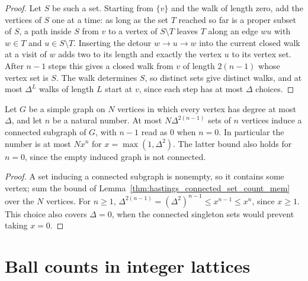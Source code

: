 \begin{proof}
    \leanok
    Let $S$ be such a set. Starting from $\{v\}$ and the walk of length zero,
    add the vertices of $S$ one at a time: as long as the set $T$ reached so
    far is a proper subset of $S$, a path inside $S$ from $v$ to a vertex of
    $S\setminus T$ leaves $T$ along an edge $wu$ with $w\in T$ and
    $u\in S\setminus T$. Inserting the detour $w\to u\to w$ into the current
    closed walk at a visit of $w$ adds two to its length and exactly the vertex
    $u$ to its vertex set. After $n-1$ steps this gives a closed walk from $v$
    of length $2(n-1)$ whose vertex set is $S$. The walk determines $S$, so
    distinct sets give distinct walks, and at most $\Delta^{L}$ walks of length
    $L$ start at $v$, since each step has at most $\Delta$ choices.
\end{proof}

\begin{lemma}
    \label{thm:hastings_connected_set_count}
    \leanok
    Let $G$ be a simple graph on $N$ vertices in which every vertex has degree
    at most $\Delta$, and let $n$ be a natural number. At most
    $N\Delta^{2(n-1)}$ sets of $n$ vertices induce a connected subgraph of $G$,
    with $n-1$ read as $0$ when $n=0$.
    In particular the number is at most $Nx^n$ for
    $x=\max(1,\Delta^2)$. The latter bound also holds for $n=0$, since the
    empty induced graph is not connected.
\end{lemma}

\begin{proof}
    \leanok
    A set inducing a connected subgraph is nonempty, so it contains some
    vertex; sum the bound of Lemma~\ref{thm:hastings_connected_set_count_mem}
    over the $N$ vertices.
    For $n\ge1$, $\Delta^{2(n-1)}=(\Delta^2)^{n-1}\le x^{n-1}\le x^n$,
    since $x\ge1$. This choice also covers $\Delta=0$, when the connected
    singleton sets would prevent taking $x=0$.
\end{proof}


\section{Ball counts in integer lattices}
\label{sec:gaussian_filtered_cluster_truncation}

